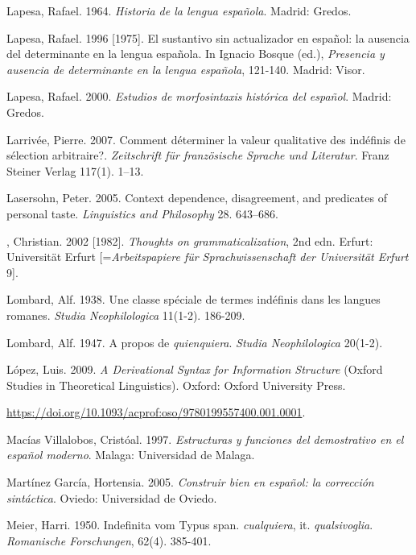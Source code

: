 \documentclass[output=paper]{langscibook}
\begin{document}
Lapesa, Rafael. 1964. \textit{Historia de la lengua española}. Madrid: Gredos.

Lapesa, Rafael. 1996 [1975]. El sustantivo sin actualizador en español: la ausencia del determinante en la lengua española. In Ignacio Bosque (ed.), \textit{Presencia y ausencia de determinante en la lengua española}, 121-140. Madrid: Visor.

Lapesa, Rafael. 2000. \textit{Estudios de morfosintaxis histórica del español}. Madrid: Gredos.

Larrivée, Pierre. 2007. Comment déterminer la valeur qualitative des indéfinis de sélection arbitraire?. \textit{Zeitschrift für französische Sprache und Literatur}. Franz Steiner Verlag 117(1). 1–13.

Lasersohn, Peter. 2005. Context dependence, disagreement, and predicates of personal taste. \textit{Linguistics and Philosophy} 28. 643–686.

\begin{styleannotationtext}
, Christian. 2002 [1982]. \textit{Thoughts on grammaticalization}, 2nd edn. Erfurt: Universität Erfurt [=\textit{Arbeitspapiere für Sprachwissenschaft der Universität Erfurt} 9].
\end{styleannotationtext}

Lombard, Alf. 1938. Une classe spéciale de termes indéfinis dans les langues romanes. \textit{Studia Neophilologica} 11(1-2). 186-209.

Lombard, Alf. 1947. A propos de \textit{quienquiera}. \textit{Studia Neophilologica} 20(1-2). 

López, Luis. 2009. \textit{A Derivational Syntax for Information Structure} (Oxford Studies in Theoretical Linguistics). Oxford: Oxford University Press. 

  \url{https://doi.org/10.1093/acprof:oso/9780199557400.001.0001}. 

Macías Villalobos, Cristóal. 1997. \textit{Estructuras y funciones del demostrativo en el español moderno}. Malaga: Universidad de Malaga.


Martínez García, Hortensia. 2005. \textit{Construir bien en español: la corrección sintáctica}. Oviedo: Universidad de Oviedo.

Meier, Harri. 1950. Indefinita vom Typus span. \textit{cualquiera}, it. \textit{qualsivoglia}. \textit{Romanische Forschungen}, 62(4). 385-401.
\end{document}
